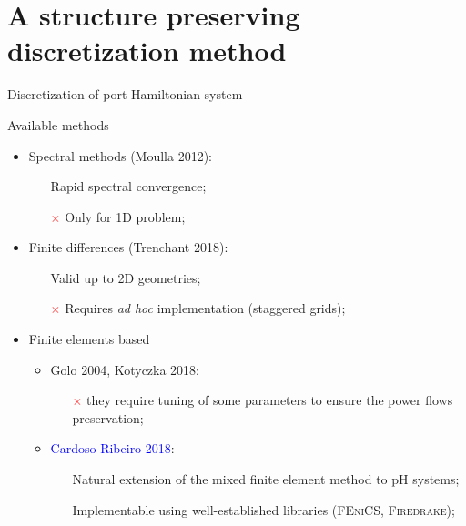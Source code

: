 \documentclass[aspectratio=169]{ISAE-Beamer}
\newcommand{\fenics}{\textsc{FEniCS}\xspace}
\newcommand{\firedrake}{\textsc{Firedrake}\xspace}
\begin{document}
\section{A structure preserving discretization method}

\begin{frame}{Discretization of port-Hamiltonian system}
\begin{exampleblock}{Available methods}
	\begin{itemize}
		\item Spectral methods (Moulla 2012):
		\begin{itemize}
			\item[\textcolor{green}{\checkmark}] Rapid spectral convergence;
			\item[\textcolor{red}{$\times$}] Only for 1D problem;
		\end{itemize}
		\item Finite differences (Trenchant 2018):
		\begin{itemize}
			\item[\textcolor{green}{\checkmark}] Valid up to 2D geometries;
			\item[\textcolor{red}{$\times$}] Requires \textit{ad hoc} implementation (staggered grids);
		\end{itemize}
		\item Finite elements based
		\begin{itemize}
			\item Golo 2004, Kotyczka 2018: 
			\begin{itemize}
				\item[\textcolor{red}{$\times$}] they require tuning of some parameters to ensure the power flows preservation;
			\end{itemize}		
			\item \textcolor{blue}{Cardoso-Ribeiro 2018}:
			\begin{itemize}
				\item[\textcolor{green}{\checkmark}] Natural extension of the mixed finite element method to pH systems;
				\item[\textcolor{green}{\checkmark}] Implementable using well-established libraries (\fenics{}, \firedrake{});
			\end{itemize}
		\end{itemize}
	\end{itemize}
\end{exampleblock}
\end{frame}
\end{document}
